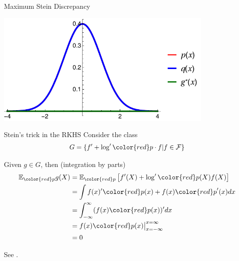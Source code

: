 \documentclass{beamer}
\begin{document}
\begin{frame}{Maximum Stein Discrepancy }
{\begin{center}
 \end{center}
}
 {
\begin{center}
\includegraphics[width=0.8\textwidth]{./img/s0.pdf} 
 \end{center}
}

 \end{frame}
 



 
 \iffalse
 
  \begin{frame}{Stein's trick in the RKHS}
Consider the  class \large
$$G = \{ f'  +  \log' { \color{red} p} \cdot  f | f \in \mathcal{F} \}$$
\normalsize

\pause

Given $g\in G$, then (integration by parts)
\begin{align*}
\ev_{\color{red} p} g(X) &=
\ev_{\color{red} p} \left[ f'(X)  +  \log' {\color{red} p}(X) f(X) \right] \\
&= \int   f(x)' { \color{red} p}(x)   + f(x){\color{red} p}'(x) dx \\
&= \int_{-\infty}^{\infty} (f(x) {\color{red} p}(x) )'  dx \\
&= f(x) {\color{red} p}(x)  \big|_{x=-\infty}^{x=\infty} \\
&= 0
\end{align*}

\scriptsize
See  \cite{gorham2015measuring,OatGirCho15}.
\normalsize
 \end{frame} 
  
\end{document}
